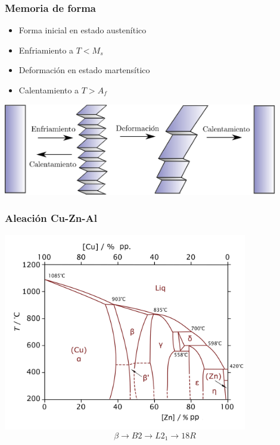 \documentclass[usenames,dvipsnames]{beamer}
\begin{document}



\begin{frame}
\frametitle{Memoria de forma}

 \begin{itemize}
  \item Forma inicial en estado austenítico
  \item Enfriamiento a $T<M_{s}$
  \item Deformación en estado martensítico
  \item Calentamiento a $T>A_{f}$
 \end{itemize}


\begin{center}
\includegraphics[width=0.9\textwidth]{img/intro/Trans.eps} 
\end{center}


\end{frame}



\begin{frame}
\frametitle{Aleación Cu-Zn-Al}
\includegraphics[width=0.8\textwidth]{img/intro/CuZn.png}
\begin{equation*}
 \beta \rightarrow B2 \rightarrow L2_1 \rightarrow 18R 
\end{equation*}
\end{frame}
\end{document}
